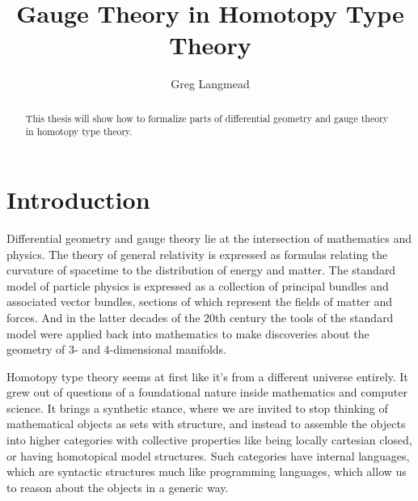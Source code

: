 \documentclass[12pt]{extarticle}
\title{Gauge Theory in Homotopy Type Theory}
\author{Greg Langmead}
\begin{document}
\maketitle
\begin{abstract}
This thesis will show how to formalize parts of differential geometry and gauge theory in homotopy type theory.\cite{freed2013chernweil} \cite{kobayashinomizu} \cite{hamilton2017} \cite{scorpan_wild_2005} \cite{baez1994gauge} \cite{atiyah1983yang}
\end{abstract}
\tableofcontents
\section{Introduction}
Differential geometry and gauge theory lie at the intersection of mathematics and physics. The theory of general relativity is expressed as formulas relating the curvature of spacetime to the distribution of energy and matter. The standard model of particle physics is expressed as a collection of principal bundles and associated vector bundles, sections of which represent the fields of matter and forces. And in the latter decades of the 20th century the tools of the standard model were applied back into mathematics to make discoveries about the geometry of 3- and 4-dimensional manifolds.

Homotopy type theory seems at first like it's from a different universe entirely. It grew out of questions of a foundational nature inside mathematics and computer science. It brings a synthetic stance, where we are invited to stop thinking of mathematical objects as sets with structure, and instead to assemble the objects into higher categories with collective properties like being locally cartesian closed, or having homotopical model structures. Such categories have internal languages, which are syntactic structures much like programming languages, which allow us to reason about the objects in a generic way.
\end{document}
